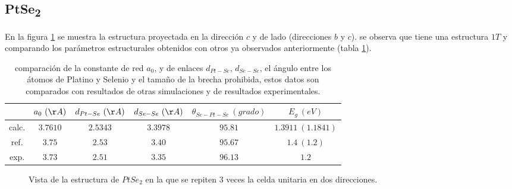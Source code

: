 \subsection{PtSe\textsubscript{2}} \label{Sim:subsec:ptse2celu}
En la figura \ref{Sim:fig:estptse2} se muestra la estructura proyectada en la direcci\'on $c$ y de lado (direcciones $b$ y $c$). se observa que tiene una estructura $1T$ y  comparando los par\'ametros estructurales obtenidos con otros ya observados anteriormente (tabla \ref{Sim:tabla:ptse2est}).
\begin{table}
	\centering
	\caption[Comparaci\'on de par\'ametros estructurales del PtSe\textsubscript{2}.]{comparaci\'on de la constante de red $a_0$, y de enlaces $d_{Pt-Se}$, $d_{Se-Se}$, el \'angulo entre los \'atomos de Platino y Selenio y el tama\~no de la brecha prohibida, estos datos son   comparados con resultados de otras simulaciones y de resultados experimentales. }
	\begin{tabular}{|c|c|c|c|c|c|}
	\hline
		    & $a_0~(\AA)$   & $d_{Pt-Se}~(\AA)$  & $d_{Se-Se}~(\AA)$  &  $\theta_{Se-Pt-Se}~(grado)$ & $E_g~(eV)$ \\
    \hline
    \hline
    calc.   & $3.7610$& $2.5343 $     & $3.3978 $  & $95.81$              & $1.3911 ~(1.1841)$\\
    ref. \cite{doi:10.1063/1.4955468}    & $3.75$& $2.53 $     & $3.40 $  & $95.67$              & $1.4 ~(1.2)$\\
    exp. \cite{datexpPt}   & $3.73$& $2.51 $     & $3.35 $  & $96.13$              & $1.2$\\
    \hline

	\end{tabular}
    \label{Sim:tabla:ptse2est}
\end{table}
\newline
\begin{figure}[!hbt]
	\centering
   \caption[Vista de la supercelda de PtSe\textsubscript{2}.]{Vista de la estructura de $PtSe_2$ en la que se repiten 3 veces la celda unitaria en dos direcciones.}
   \label{Sim:fig:estptse2}
\end{figure}
\newline
